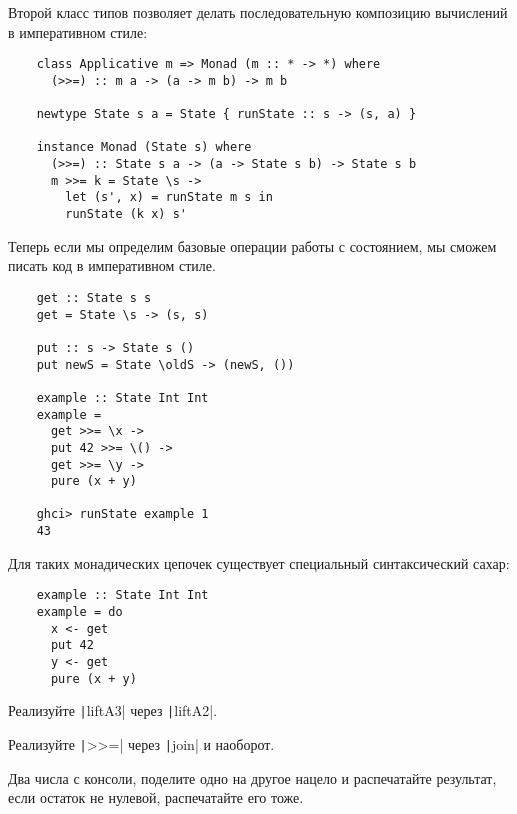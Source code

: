 Второй класс типов позволяет делать последовательную композицию вычислений в императивном стиле:
\begin{verbatim}
    class Applicative m => Monad (m :: * -> *) where
      (>>=) :: m a -> (a -> m b) -> m b

    newtype State s a = State { runState :: s -> (s, a) }

    instance Monad (State s) where
      (>>=) :: State s a -> (a -> State s b) -> State s b
      m >>= k = State \s ->
        let (s', x) = runState m s in
        runState (k x) s'
\end{verbatim}

Теперь если мы определим базовые операции работы с состоянием, мы сможем писать код в императивном стиле.
\begin{verbatim}
    get :: State s s
    get = State \s -> (s, s)

    put :: s -> State s ()
    put newS = State \oldS -> (newS, ())

    example :: State Int Int
    example =
      get >>= \x ->
      put 42 >>= \() ->
      get >>= \y ->
      pure (x + y)

    ghci> runState example 1
    43
\end{verbatim}

Для таких монадических цепочек существует специальный синтаксический сахар:
\begin{verbatim}
    example :: State Int Int
    example = do
      x <- get
      put 42
      y <- get
      pure (x + y)
\end{verbatim}

\begin{task}
    Реализуйте \texttt|liftA3| через \texttt|liftA2|.
\end{task}

\begin{task}
    Реализуйте \texttt|>>=| через \texttt|join| и наоборот.
\end{task}

\begin{task}
    Два числа с консоли, поделите одно на другое нацело и распечатайте результат, если остаток не нулевой, распечатайте его тоже.
\end{task}

